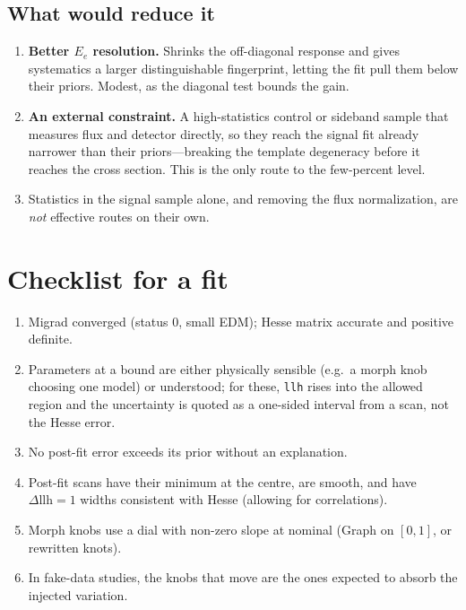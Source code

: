 \documentclass[11pt]{article}
\newcommand{\code}[1]{\texttt{#1}}
\begin{document}
\subsection{What would reduce it}

\begin{enumerate}
  \item \textbf{Better $E_e$ resolution.} Shrinks the off-diagonal response and
    gives systematics a larger distinguishable fingerprint, letting the fit pull
    them below their priors. Modest, as the diagonal test bounds the gain.
  \item \textbf{An external constraint.} A high-statistics control or sideband
    sample that measures flux and detector directly, so they reach the signal
    fit already narrower than their priors---breaking the template degeneracy
    before it reaches the cross section. This is the only route to the
    few-percent level.
  \item Statistics in the signal sample alone, and removing the flux
    normalization, are \emph{not} effective routes on their own.
\end{enumerate}

\section{Checklist for a fit}

\begin{enumerate}
  \item Migrad converged (status 0, small EDM); Hesse matrix accurate and positive
    definite.
  \item Parameters at a bound are either physically sensible (e.g.\ a morph knob
    choosing one model) or understood; for these, \code{llh} rises into the
    allowed region and the uncertainty is quoted as a one-sided interval from a
    scan, not the Hesse error.
  \item No post-fit error exceeds its prior without an explanation.
  \item Post-fit scans have their minimum at the centre, are smooth, and have
    $\Delta\text{llh}=1$ widths consistent with Hesse (allowing for correlations).
  \item Morph knobs use a dial with non-zero slope at nominal (Graph on $[0,1]$, or
    rewritten knots).
  \item In fake-data studies, the knobs that move are the ones expected to absorb
    the injected variation.
\end{enumerate}
\end{document}

